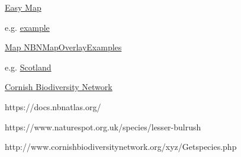 \documentclass[a4paper,12pt,landscape]{article}
\begin{document}
\href{https://easymap.nbnatlas.org/}{Easy Map}

e.g. \href{https://easymap.nbnatlas.org/Image?tvk=NHMSYS0000458716&w=800}{example}

\href{https://github.com/DuncanRowland/NBNMapOverlayExamples}{Map NBNMapOverlayExamples}

e.g. \href{https://duncanrowland.github.io/NBNMapOverlayExamples/leaflet1.html}{Scotland}

\href{http://www.cornishbiodiversitynetwork.org/xyz/Get1km.php}{Cornish Biodiversity Network}


https://docs.nbnatlas.org/


https://www.naturespot.org.uk/species/lesser-bulrush

http://www.cornishbiodiversitynetwork.org/xyz/Getspecies.php
\end{document}
